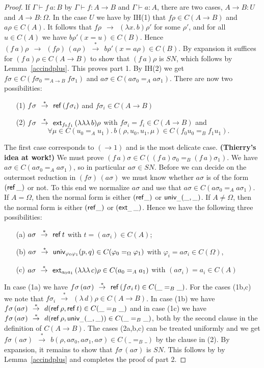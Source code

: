 \documentclass[10pt,a4paper]{article}
\newcommand{\lam}[2]{\lambda{#1.\,#2}}
\newcommand{\red}{~~{\to}~~}
\newcommand{\unphis}{{\univ_{\varphi_0\varphi_1}}}
\newcommand{\extfs}{{\ext_{f_0 f_1}}}
\newcommand{\extas}{{\ext_{a_0 a_1}}}
\newcommand{\rtr}{~~{\stackrel{*}{\to}}~~}
\newcommand{\SN}{\mathit{SN}}
\newcommand{\Ref}{{\sf ref}}
\newcommand{\ext}{{\sf ext}}
\newcommand{\univ}{{\sf univ}}
\begin{document}
\begin{proof}
If $\Gamma\vdash f\,a:B$ by $\Gamma\vdash f:A{\to}B$ and $\Gamma\vdash a:A$,
there are two cases, $A{\to}B:U$ and $A{\to}B:\Omega$.
In the case $U$ we have by IH(1) that $f\rho\in C(A{\to}B)$ 
and $a\rho\in C(A)$. It follows that 
$f\rho\red(\lam{x}{b})\rho'$ for some $\rho'$, 
and for all $u\in C(A)$ we have $b\rho'(x{=}u) \in C(B)$. 
Hence $(f\,a)\rho \red (f\rho)\,(a\rho) \rtr b\rho'(x{=}a\rho) \in C(B)$.
By expansion it suffices for $(f\,a)\rho\in C(A{\to}B)$ to show that 
$(f\,a)\rho$ is $\SN$, which follows by Lemma~\ref{accindplus}.
This proves part 1.
By IH(2) we get $f\sigma\in C(f\sigma_0  =_{A{\to}B} f\sigma_1 )$ 
and $a\sigma\in C(a\sigma_0  =_A a\sigma_1 )$. 
There are now two possibilities:
\begin{enumerate}
  \item[(1)] $f\sigma \rtr \Ref\,(f\sigma_i )$ and $f\sigma_i \in C(A{\to}B)$
  \item[(2)] $f\sigma \rtr \extfs\,(\lambda\lambda\lambda\,b)\rho$ with
  $f\sigma_i  = f_i \in C(A{\to}B)$ and 
  \[\forall\mu\in C(u_0 =_A u_1).\,b(\rho,u_0,u_1,\mu) \in C(f_0 u_0 =_B f_1 u_1).\]
\end{enumerate}
The first case corresponds to $({\to}1)$ and is the most delicate case.
{\bf (Thierry's idea at work!)}
We must prove $(f\,a)\sigma\in C((f\,a)\sigma_0 =_B (f\,a)\sigma_1)$.
We have $a\sigma\in C(a\sigma_0  =_A a\sigma_1 )$, so in particular $a\sigma\in\SN$.
Before we can decide on the outermost reduction in $(f\sigma)\,(a\sigma)$
we must know whether $a\sigma$ is of the form $(\Ref\,\_)$ or not.
To this end we normalize $a\sigma$ and use that $a\sigma\in C(a\sigma_0  =_A a\sigma_1 )$.
If $A=\Omega$, then the normal form is either $(\Ref\_)$ or $\univ_\_(\_,\_)$.
If $A\not=\Omega$, then the normal form is either $(\Ref\_)$ or $(\ext_\_\,\_)$.
Hence we have the following three possibilities:
\begin{enumerate}
  \item[(a)] $a\sigma \rtr \Ref\,t$ with  $t = (a\sigma_i )\in C(A)$;
  \item[(b)] $a\sigma \rtr \unphis(p,q)\in C(\varphi_0 =_\Omega \varphi_1)$ with 
  $\varphi_i = a\sigma_i \in C(\Omega)$,
  \item[(c)] $a\sigma \rtr \extas\,(\lambda\lambda\lambda\,c)\rho \in C(a_0 =_A a_1)$
     with $(a\sigma_i ) = a_i \in C(A)$
\end{enumerate}
In case (1a) we have $f\sigma\,(a\sigma)\rtr\Ref\,(f\sigma_i \,t)\in C(\_ =_B \_)$.
For the cases (1b,c) we note that $f\sigma_i  \rtr (\lambda\,d)\rho \in C(A{\to}B)$.
In case (1b) we have
$f\sigma\,(a\sigma)\rtr d(\Ref\,\rho,\Ref\,t)\in C(\_ =_B \_)$ 
and in case (1c) we have
$f\sigma\,(a\sigma)\rtr d(\Ref\,\rho,\univ_\_(\_,\_))\in C(\_ =_B \_)$,
both by the second clause in the definition of $C(A{\to}B)$.
The cases (2a,b,c) can be treated uniformly and we get 
$f\sigma\,(a\sigma)\rtr b(\rho,a\sigma_0 ,a\sigma_1 ,a\sigma)\in C(\_ =_B \_)$
by the clause in (2). By expansion, it remains to show that $f\sigma\,(a\sigma)$
is $\SN$. This follows by by Lemma~\ref{accindplus} and completes the proof of part 2.


\end{proof}
\end{document}
